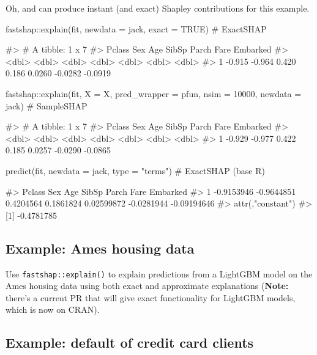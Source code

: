 Oh, and  can produce instant (and exact) Shapley
contributions for this example.

\begin{Schunk}
\begin{Sinput}
fastshap::explain(fit, newdata = jack, exact = TRUE)  # ExactSHAP
\end{Sinput}
\begin{Soutput}
#> # A tibble: 1 x 7
#>   Pclass    Sex   Age SibSp  Parch    Fare Embarked
#>    <dbl>  <dbl> <dbl> <dbl>  <dbl>   <dbl>    <dbl>
#> 1 -0.915 -0.964 0.420 0.186 0.0260 -0.0282  -0.0919
\end{Soutput}
\begin{Sinput}
fastshap::explain(fit, X = X, pred_wrapper = pfun, nsim = 10000,
                  newdata = jack)  # SampleSHAP
\end{Sinput}
\begin{Soutput}
#> # A tibble: 1 x 7
#>   Pclass    Sex   Age SibSp  Parch    Fare Embarked
#>    <dbl>  <dbl> <dbl> <dbl>  <dbl>   <dbl>    <dbl>
#> 1 -0.929 -0.977 0.422 0.185 0.0257 -0.0290  -0.0865
\end{Soutput}
\begin{Sinput}
predict(fit, newdata = jack, type = "terms")  # ExactSHAP (base R)
\end{Sinput}
\begin{Soutput}
#>       Pclass        Sex       Age     SibSp      Parch       Fare    Embarked
#> 1 -0.9153946 -0.9644851 0.4204564 0.1861824 0.02599872 -0.0281944 -0.09194646
#> attr(,"constant")
#> [1] -0.4781785
\end{Soutput}
\end{Schunk}

\hypertarget{example-ames-housing-data}{%
\subsection{Example: Ames housing
data}\label{example-ames-housing-data}}

Use \texttt{fastshap::explain()} to explain predictions from a LightGBM
model on the Ames housing data using both exact and approximate
explanations (\textbf{Note:} there's a current PR that will give exact
functionality for LightGBM models, which is now on CRAN).

\hypertarget{example-default-of-credit-card-clients}{%
\subsection{Example: default of credit card
clients}\label{example-default-of-credit-card-clients}}

